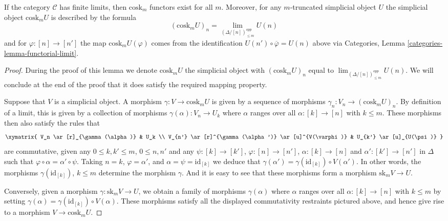 \begin{lemma}
\label{lemma-existence-cosk}
If the category $\mathcal{C}$ has finite limits, then
$\text{cosk}_m$ functors exist for all $m$. Moreover,
for any $m$-truncated simplicial object $U$ the
simplicial object $\text{cosk}_mU$ is described
by the formula
$$
(\text{cosk}_mU)_n = \lim_{(\Delta/[n])_{\leq m}^{opp}} U(n)
$$
and for $\varphi : [n] \to [n']$ the map
$\text{cosk}_mU(\varphi)$ comes from the
identification $U(n') \circ \overline{\varphi} = U(n)$ above
via Categories, Lemma \ref{categories-lemma-functorial-limit}.
\end{lemma}

\begin{proof}
During the proof of this lemma we denote $\text{cosk}_mU$ the
simplicial object with $(\text{cosk}_mU)_n$ equal to
$\lim_{(\Delta/[n])_{\leq m}^{opp}} U(n)$.
We will conclude at the end of the proof that it does
satisfy the required mapping property.

\medskip\noindent
Suppose that $V$ is a simplicial object.
A morphism $\gamma : V \to \text{cosk}_mU$ is given by a sequence
of morphisms $\gamma_n : V_n \to (\text{cosk}_mU)_n$.
By definition of a limit, this is given by a
collection of morphisms $\gamma(\alpha) : V_n \to U_k$
where $\alpha$ ranges over all $\alpha : [k] \to [n]$
with $k \leq m$. These morphisms then also satisfy
the rules that
$$
\xymatrix{
V_n \ar[r]_{\gamma(\alpha)} &  U_k \\
V_{n'} \ar[r]^{\gamma(\alpha')} \ar[u]^{V(\varphi)} & U_{k'} \ar[u]_{U(\psi)}
}
$$
are commutative, given any $0 \leq k, k' \leq m$, $0 \leq n, n'$
and any $\psi : [k] \to [k']$, $\varphi : [n] \to [n']$,
$\alpha : [k] \to [n]$ and $\alpha' : [k'] \to [n']$ in $\Delta$
such that $\varphi \circ \alpha = \alpha' \circ \psi$.
Taking $n = k$, $\varphi = \alpha'$, and $\alpha = \psi = \text{id}_{[k]}$
we deduce that $\gamma(\alpha') = \gamma(\text{id}_{[k]}) \circ V(\alpha')$.
In other words, the morphisms $\gamma(\text{id}_{[k]})$, $k \leq m$
determine the morphism $\gamma$. And it is easy to see that these
morphisms form a morphism $\text{sk}_m V \to U$.

\medskip\noindent
Conversely, given a morphism $\gamma : \text{sk}_m V \to U$,
we obtain a family of morphisms $\gamma(\alpha)$
where $\alpha$ ranges over all $\alpha : [k] \to [n]$
with $k \leq m$ by setting $\gamma(\alpha) =
\gamma(\text{id}_{[k]}) \circ V(\alpha)$. These morphisms
satisfy all the displayed commutativity restraints pictured
above, and hence give rise to a morphism $V \to \text{cosk}_m U$.
\end{proof}

